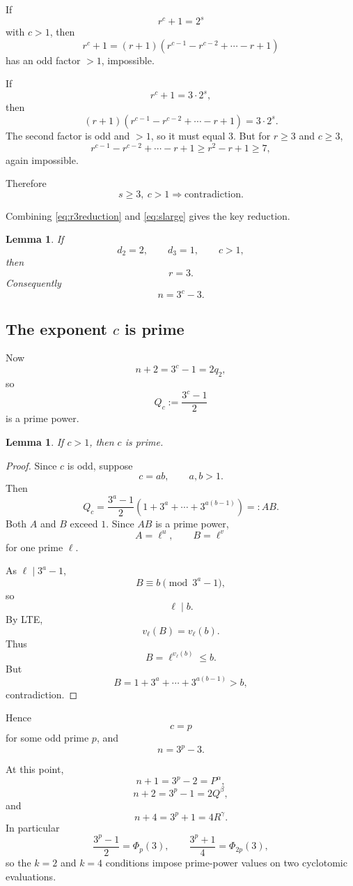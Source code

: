 \documentclass[11pt]{article}
\newtheorem{lemma}[theorem]{Lemma}
\newcommand{\PhiC}{\Phi}
\begin{document}
If
\[
r^c+1=2^s
\]
with \(c>1\), then
\[
r^c+1=(r+1)
(r^{c-1}-r^{c-2}+\cdots-r+1)
\]
has an odd factor \(>1\), impossible.

If
\[
r^c+1=3\cdot2^s,
\]
then
\[
(r+1)
(r^{c-1}-r^{c-2}+\cdots-r+1)=3\cdot2^s.
\]
The second factor is odd and \(>1\), so it must equal \(3\).  But for
\(r\geq3\) and \(c\geq3\),
\[
r^{c-1}-r^{c-2}+\cdots-r+1
\geq r^2-r+1\geq7,
\]
again impossible.

Therefore
\[
\boxed{
s\geq3,\ c>1
\Longrightarrow
\text{contradiction}.
}
\tag{16}\label{eq:slarge}
\]

Combining \eqref{eq:r3reduction} and \eqref{eq:slarge} gives the key reduction.

\begin{lemma}\label{lem:r3}
If
\[
d_2=2,\qquad d_3=1,\qquad c>1,
\]
then
\[
\boxed{r=3}.
\]
Consequently
\[
\boxed{n=3^c-3.}
\]
\end{lemma}

\subsection{The exponent \(c\) is prime}

Now
\[
n+2=3^c-1=2q_2,
\]
so
\[
Q_c:=\frac{3^c-1}{2}
\]
is a prime power.

\begin{lemma}\label{lem:cprime}
If \(c>1\), then \(c\) is prime.
\end{lemma}

\begin{proof}
Since \(c\) is odd, suppose
\[
c=ab,\qquad a,b>1.
\]
Then
\[
Q_c=
\frac{3^a-1}{2}
(1+3^a+\cdots+3^{a(b-1)})
=:AB.
\]
Both \(A\) and \(B\) exceed \(1\).  Since \(AB\) is a prime power,
\[
A=\ell^u,\qquad B=\ell^v
\]
for one prime \(\ell\).

As \(\ell\mid3^a-1\),
\[
B\equiv b\pmod{3^a-1},
\]
so
\[
\ell\mid b.
\]
By LTE,
\[
v_\ell(B)=v_\ell(b).
\]
Thus
\[
B=\ell^{v_\ell(b)}\leq b.
\]
But
\[
B=1+3^a+\cdots+3^{a(b-1)}>b,
\]
contradiction.
\end{proof}

Hence
\[
\boxed{c=p}
\]
for some odd prime \(p\), and
\[
\boxed{n=3^p-3.}
\tag{17}
\]

At this point,
\[
n+1=3^p-2=P^\alpha,
\tag{18}
\]
\[
n+2=3^p-1=2Q^\beta,
\tag{19}
\]
and
\[
n+4=3^p+1=4R^\gamma.
\tag{20}
\]
In particular
\[
\frac{3^p-1}{2}=\PhiC_p(3),
\qquad
\frac{3^p+1}{4}=\PhiC_{2p}(3),
\]
so the \(k=2\) and \(k=4\) conditions impose prime-power values on two
cyclotomic evaluations.
\end{document}
